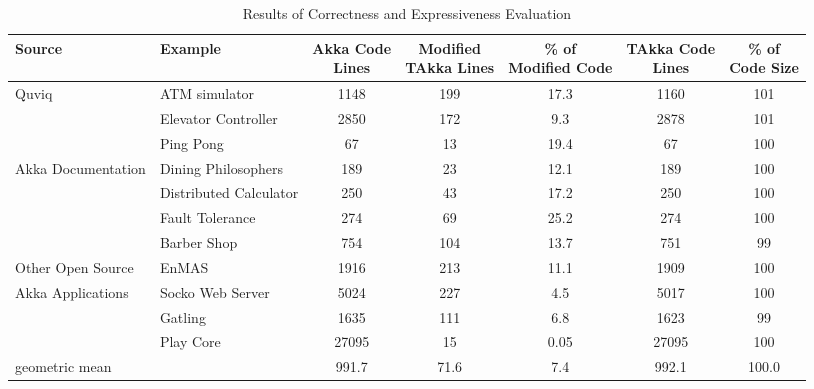 \begin{table}[t]
\begin{center}
\begin{tabular}{| p{2.3 cm} | p{2.3 cm} | c | c |  c | c | c |}
\hline

Source & Example & \specialcell{Akka Code \\ Lines} &
\specialcell{Modified\\ TAkka Lines} & \specialcell{\% of \\Modified Code} &
\specialcell{TAkka Code\\ Lines}
& \specialcell{\% of \\Code Size} \\
\hline
Quviq   & ATM simulator & 1148 & 199 & 17.3 & 1160 & 101 \\
\cline{2-7}
\citep{quviq}                                    & Elevator Controller &
2850 & 172 & 9.3 & 2878 & 101 \\
\hline


                                                               & Ping Pong & 67
& 13 & 19.4 & 67 & 100 \\
\cline{2-7}
Akka Documentation                 & Dining Philosophers & 189 & 23 & 12.1 &
189 & 100  \\
\cline{2-7}
 \citep{akka_doc}             & Distributed Calculator  & 250 &
43 & 17.2 & 250 & 100 \\
\cline{2-7}
                                                     & Fault Tolerance & 274 &
69 & 25.2 & 274 & 100 \\
\hline

                                                    & Barber Shop \citep{BarberShop}& 754 & 104 & 
13.7 & 751 & 99 \\
\cline{2-7}
Other Open Source             & EnMAS \citep{EnMAS} & 1916 & 213 & 11.1 & 1909 &
100 \\
\cline{2-7}
  Akka Applications                & Socko Web Server \citep{SOCKO}  & 5024 & 227
& 4.5 & 5017 & 100 \\
\cline{2-7}
                                                     & Gatling \citep{Gatling}
& 1635 & 111 & 6.8 & 1623 & 99 \\
\cline{2-7}
                                                     & Play Core \citep{play_doc}
& 27095 & 15 & 0.05 & 27095 & 100 \\
\hline
geometric mean                   & & 991.7 & 71.6 & 7.4 & 992.1 & 100.0 \\
\hline
\end{tabular}
\caption{Results of Correctness and Expressiveness Evaluation}
\end{center}
\label{express}
\end{table}

